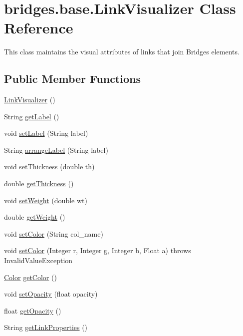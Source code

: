 \hypertarget{classbridges_1_1base_1_1_link_visualizer}{}\section{bridges.\+base.\+Link\+Visualizer Class Reference}
\label{classbridges_1_1base_1_1_link_visualizer}


This class maintains the visual attributes of links that join Bridges elements.  


\subsection*{Public Member Functions}
\begin{DoxyCompactItemize}
\item 
\hyperlink{classbridges_1_1base_1_1_link_visualizer_a0b69f099fa264ae9097b0efe278c6a1b}{Link\+Visualizer} ()
\item 
String \hyperlink{classbridges_1_1base_1_1_link_visualizer_a9ed60a0f8a337cd2c98b2d6ab07b8601}{get\+Label} ()
\item 
void \hyperlink{classbridges_1_1base_1_1_link_visualizer_a073d84e04dd95c3848c9f4e0ad74eb77}{set\+Label} (String label)
\item 
String \hyperlink{classbridges_1_1base_1_1_link_visualizer_a9f5ca95a4ab07165bbe0de271534cc41}{arrange\+Label} (String label)
\item 
void \hyperlink{classbridges_1_1base_1_1_link_visualizer_a702e9ca345d1a4a035baf2041f275849}{set\+Thickness} (double th)
\item 
double \hyperlink{classbridges_1_1base_1_1_link_visualizer_af1592d2a8664b00c1a51fdc0f8d1860a}{get\+Thickness} ()
\item 
void \hyperlink{classbridges_1_1base_1_1_link_visualizer_a21d5884d243cf5a08f9d544f5083a44c}{set\+Weight} (double wt)
\item 
double \hyperlink{classbridges_1_1base_1_1_link_visualizer_ac96d7fb118ae6c7e1bdd57c5e2c8639a}{get\+Weight} ()
\item 
void \hyperlink{classbridges_1_1base_1_1_link_visualizer_a92f306dbd73b961befa8ab4c0620a89e}{set\+Color} (String col\+\_\+name)
\item 
void \hyperlink{classbridges_1_1base_1_1_link_visualizer_a003905cfe33e1704555b2b3a1cf99bad}{set\+Color} (Integer r, Integer g, Integer b, Float a)  throws Invalid\+Value\+Exception 
\item 
\hyperlink{classbridges_1_1base_1_1_color}{Color} \hyperlink{classbridges_1_1base_1_1_link_visualizer_a3ed52d98ecab99c6d8dd136fba913b7d}{get\+Color} ()
\item 
void \hyperlink{classbridges_1_1base_1_1_link_visualizer_ac0d59614dbc65ed0a19c25c493a1deaa}{set\+Opacity} (float opacity)
\item 
float \hyperlink{classbridges_1_1base_1_1_link_visualizer_a07cdd435a54e4b612ad63614f2a27a4a}{get\+Opacity} ()
\item 
String \hyperlink{classbridges_1_1base_1_1_link_visualizer_ab64d9b7e2b99f7ebce80cbabfe4adf2a}{get\+Link\+Properties} ()
\end{DoxyCompactItemize}



